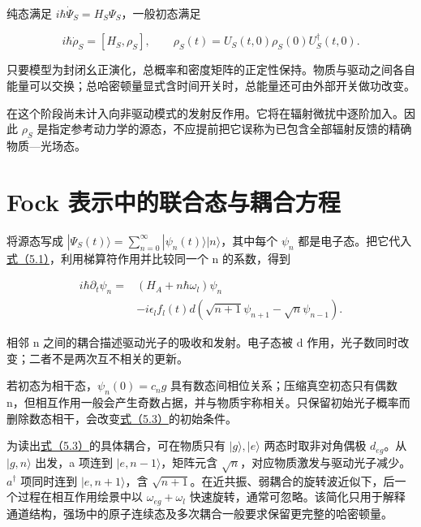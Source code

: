 \documentclass[UTF8,a4paper,zihao=-4,openany,fontset=fandol]{ctexbook}
\begin{document}
纯态满足 $i\hbar\dot\Psi_S=H_S\Psi_S$，一般初态满足



\begin{equation*}
i\hbar\dot\rho_S=[H_S,\rho_S],\qquad
\rho_S(t)=U_S(t,0)\rho_S(0)U_S^\dagger(t,0).
\tag{5.2}\label{eq:5.2}
\end{equation*}


只要模型为封闭幺正演化，总概率和密度矩阵的正定性保持。物质与驱动之间各自能量可以交换；总哈密顿量显式含时间开关时，总能量还可由外部开关做功改变。



在这个阶段尚未计入向非驱动模式的发射反作用。它将在辐射微扰中逐阶加入。因此 $\rho_S$ 是指定参考动力学的源态，不应提前把它误称为已包含全部辐射反馈的精确物质—光场态。



\section{Fock 表示中的联合态与耦合方程}\label{sec:05:5}


将源态写成 $|\Psi_S(t)\rangle=\sum_{n=0}^{\infty}|\psi_n(t)\rangle|n\rangle$，其中每个 $\psi_n$ 都是电子态。把它代入\hyperref[eq:5.1]{式（5.1）}，利用梯算符作用并比较同一个 n 的系数，得到



\begin{equation*}
\begin{aligned}
i\hbar\partial_t\psi_n={}&(H_A+n\hbar\omega_l)\psi_n\\
&-i\epsilon_l f_l(t)d
\left(\sqrt{n+1}\psi_{n+1}-\sqrt n\psi_{n-1}\right).
\end{aligned}
\tag{5.3}\label{eq:5.3}
\end{equation*}


相邻 n 之间的耦合描述驱动光子的吸收和发射。电子态被 d 作用，光子数同时改变；二者不是两次互不相关的更新。



若初态为相干态，$\psi_n(0)=c_ng$ 具有数态间相位关系；压缩真空初态只有偶数 n，但相互作用一般会产生奇数占据，并与物质宇称相关。只保留初始光子概率而删除数态相干，会改变\hyperref[eq:5.3]{式（5.3）}的初始条件。



为读出\hyperref[eq:5.3]{式（5.3）}的具体耦合，可在物质只有 $|g\rangle,|e\rangle$ 两态时取非对角偶极 $d_{eg}$。从 $|g,n\rangle$ 出发，a 项连到 $|e,n-1\rangle$，矩阵元含 $\sqrt n$，对应物质激发与驱动光子减少。$a^\dagger$ 项同时连到 $|e,n+1\rangle$，含 $\sqrt{n+1}$。在近共振、弱耦合的旋转波近似下，后一个过程在相互作用绘景中以 $\omega_{eg}+\omega_l$ 快速旋转，通常可忽略。该简化只用于解释通道结构，强场中的原子连续态及多次耦合一般要求保留更完整的哈密顿量。
\end{document}
